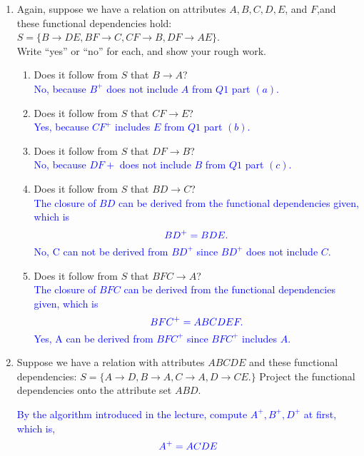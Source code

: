 \documentclass{article}
\begin{document}
\begin{enumerate}
    \item Again, suppose we have a relation on attributes $A,B,C,D,E$, and $F$,and these functional dependencies hold: $S = \{B \rightarrow DE, BF \rightarrow C, CF \rightarrow B, DF \rightarrow AE\}$.
    \\Write “yes” or “no” for each, and show your rough work.
    \begin{enumerate}
        \item Does it follow from $S$ that $B \rightarrow A$?
        \\
        \textcolor{blue}{No, because $B^+$ does not include $A$ from $Q1$ part $(a)$.}
        \item Does it follow from $S$ that $CF \rightarrow E$?
        \\
        \textcolor{blue}{Yes, because $CF^+$ includes $E$ from $Q1$ part $(b)$.}
        \item Does it follow from $S$ that $DF \rightarrow B$?
        \\
        \textcolor{blue}{No, because $DF+$ does not include $B$ from $Q1$ part $(c)$.}
        \item Does it follow from $S$ that $BD \rightarrow C$?
        \\
        \textcolor{blue}{The closure of $BD$ can be derived from the functional dependencies given, which is}
        \[\textcolor{blue}{BD^+ = BDE.}\]
        \textcolor{blue}{No, C can not be derived from $BD^+$ since $BD^+$ does not include $C$.}
        \item Does it follow from $S$ that $BFC \rightarrow A$?
        \\
        \textcolor{blue}{The closure of $BFC$ can be derived from the functional dependencies given, which is}
        \[\textcolor{blue}{BFC^+ = ABCDEF.}\]
        \textcolor{blue}{Yes, A can be derived from $BFC^+$ since $BFC^+$ includes $A$.}
    \end{enumerate}
    \item Suppose we have a relation with attributes $ABCDE$ and these functional dependencies: $S = \{ A \rightarrow D, B \rightarrow A, C \rightarrow A, D \rightarrow CE. \}$ Project the functional dependencies onto the attribute set $ABD$.
    \\
    \begin{mybox}
    \textcolor{blue}{By the algorithm introduced in the lecture, compute $A^+, B^+, D^+$ at first, which is,}
    \begin{gather*}
        \textcolor{blue}{A^+ = ACDE}\\

\end{gather*}
\end{mybox}
\end{enumerate}
\end{document}
